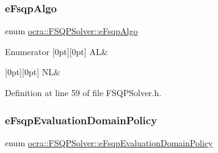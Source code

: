 \subsubsection{\texorpdfstring{e\+Fsqp\+Algo}{eFsqpAlgo}}
{\footnotesize\ttfamily enum \hyperlink{classocra_1_1FSQPSolver_ad43d4e2dae6954df05123077cea0b7f5}{ocra\+::\+F\+S\+Q\+P\+Solver\+::e\+Fsqp\+Algo}}

\begin{DoxyEnumFields}{Enumerator}
[0pt][0pt]{}\hypertarget{classocra_1_1FSQPSolver_ad43d4e2dae6954df05123077cea0b7f5aa3acfd90b159b9e093ee3cce0c93aaf8}{}\label{classocra_1_1FSQPSolver_ad43d4e2dae6954df05123077cea0b7f5aa3acfd90b159b9e093ee3cce0c93aaf8} 
AL&\\
\hline

[0pt][0pt]{}\hypertarget{classocra_1_1FSQPSolver_ad43d4e2dae6954df05123077cea0b7f5a6aa754c3fb42f49994523f0d4ec2e6e9}{}\label{classocra_1_1FSQPSolver_ad43d4e2dae6954df05123077cea0b7f5a6aa754c3fb42f49994523f0d4ec2e6e9} 
NL&\\
\hline

\end{DoxyEnumFields}


Definition at line 59 of file F\+S\+Q\+P\+Solver.\+h.

\hypertarget{classocra_1_1FSQPSolver_a0569ab06022ffef1bd6d97599a5e4279}{}\label{classocra_1_1FSQPSolver_a0569ab06022ffef1bd6d97599a5e4279} 
\subsubsection{\texorpdfstring{e\+Fsqp\+Evaluation\+Domain\+Policy}{eFsqpEvaluationDomainPolicy}}
{\footnotesize\ttfamily enum \hyperlink{classocra_1_1FSQPSolver_a0569ab06022ffef1bd6d97599a5e4279}{ocra\+::\+F\+S\+Q\+P\+Solver\+::e\+Fsqp\+Evaluation\+Domain\+Policy}}


